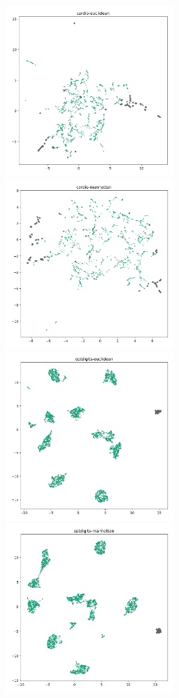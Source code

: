 \documentclass{article}
\begin{document}
\begin{figure}
   \centering
   \includegraphics[width=2.5in]{images/umaps/cardio-euclidean-umap2d.png}
   \includegraphics[width=2.5in]{images/umaps/cardio-manhattan-umap2d.png}
   \includegraphics[width=2.5in]{images/umaps/optdigits-euclidean-umap2d.png}
   \includegraphics[width=2.5in]{images/umaps/optdigits-manhattan-umap2d.png}

\end{figure}
\end{document}
